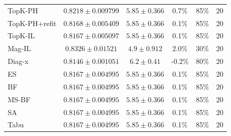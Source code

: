 \begin{longtable}{@{}lccccc@{}}
\quad TopK-PH & \(0.8218 \pm 0.009799\) & \(5.85 \pm 0.366\) & 0.7\% & 85\% & \(20\) \\
\quad TopK-PH+refit & \(0.8168 \pm 0.005409\) & \(5.85 \pm 0.366\) & 0.1\% & 85\% & \(20\) \\
\quad TopK-IL & \(0.8167 \pm 0.005097\) & \(5.85 \pm 0.366\) & 0.1\% & 85\% & \(20\) \\
\quad Mag-IL & \(0.8326 \pm 0.01521\) & \(4.9 \pm 0.912\) & 2.0\% & 30\% & \(20\) \\
\quad Diag-x & \(0.8146 \pm 0.001051\) & \(6.2 \pm 0.41\) & -0.2\% & 80\% & \(20\) \\
\quad ES & \(0.8167 \pm 0.004995\) & \(5.85 \pm 0.366\) & 0.1\% & 85\% & \(20\) \\
\quad BF & \(0.8167 \pm 0.004995\) & \(5.85 \pm 0.366\) & 0.1\% & 85\% & \(20\) \\
\quad MS-BF & \(0.8167 \pm 0.004995\) & \(5.85 \pm 0.366\) & 0.1\% & 85\% & \(20\) \\
\quad SA & \(0.8167 \pm 0.004995\) & \(5.85 \pm 0.366\) & 0.1\% & 85\% & \(20\) \\
\quad Tabu & \(0.8167 \pm 0.004995\) & \(5.85 \pm 0.366\) & 0.1\% & 85\% & \(20\) \\
\bottomrule
\end{longtable}
